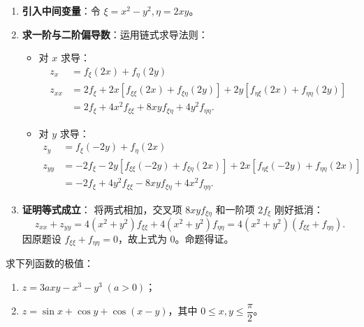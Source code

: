 \documentclass[lang=cn,11pt]{elegantbook}
\begin{document}
\begin{solution}
\begin{enumerate}
  \item \textbf{引入中间变量}：令 $\xi = x^2-y^2, \eta = 2xy$。
  \item \textbf{求一阶与二阶偏导数}：运用链式求导法则：
  \begin{itemize}
    \item 对 $x$ 求导：
      \begin{align*}
      z_x &= f_\xi(2x) + f_\eta(2y) \\[4pt]
      z_{xx} &= 2f_\xi + 2x[f_{\xi\xi}(2x) + f_{\xi\eta}(2y)] + 2y[f_{\eta\xi}(2x) + f_{\eta\eta}(2y)] \\[4pt]
      &= 2f_\xi + 4x^2 f_{\xi\xi} + 8xy f_{\xi\eta} + 4y^2 f_{\eta\eta}.
      \end{align*}
    \item 对 $y$ 求导：
      \begin{align*}
      z_y &= f_\xi(-2y) + f_\eta(2x) \\[4pt]
      z_{yy} &= -2f_\xi - 2y[f_{\xi\xi}(-2y) + f_{\xi\eta}(2x)] + 2x[f_{\eta\xi}(-2y) + f_{\eta\eta}(2x)] \\[4pt]
      &= -2f_\xi + 4y^2 f_{\xi\xi} - 8xy f_{\xi\eta} + 4x^2 f_{\eta\eta}.
      \end{align*}
  \end{itemize}
  \item \textbf{证明等式成立}：
  将两式相加，交叉项 $8xy f_{\xi\eta}$ 和一阶项 $2f_\xi$ 刚好抵消：
  \[
  z_{xx} + z_{yy} = 4(x^2+y^2)f_{\xi\xi} + 4(x^2+y^2)f_{\eta\eta} = 4(x^2+y^2)(f_{\xi\xi} + f_{\eta\eta}).
  \]
  因原题设 $f_{\xi\xi} + f_{\eta\eta} = 0$，故上式为 $0$。命题得证。
\end{enumerate}
\end{solution}



\begin{exercise}[多元函数的极值计算]
求下列函数的极值：
\begin{enumerate}
  \item $z=3axy-x^3-y^3\;(a>0)$；
  \item $z=\sin x+\cos y+\cos(x-y)$，其中 $0\leq x,y\leq\dfrac{\pi}{2}$。
\end{enumerate}
\end{exercise}
\end{document}

